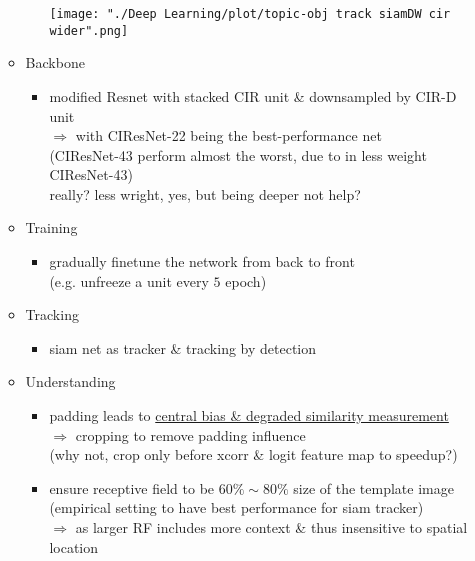 \begin{itemize}
\begin{itemize}
\begin{itemize}
		\texttt{[image: "./Deep Learning/plot/topic-obj track siamDW cir wider".png]}
		\end{itemize}
	\item Backbone
		\begin{itemize}
		\item modified Resnet with stacked CIR unit \& downsampled by CIR-D unit \\
		$\Rightarrow$ with CIResNet-22 being the best-performance net \\
		(CIResNet-43 perform almost the worst, due to in less weight CIResNet-43) \\ 
		really? less wright, yes, but being deeper not help?
		\end{itemize}
	\item Training
		\begin{itemize}
		\item gradually finetune the network from back to front \\ 
		(e.g. unfreeze a unit every $5$ epoch)
		\end{itemize}
	\item Tracking
		\begin{itemize}
		\item siam net as tracker \& tracking by detection
		\end{itemize}
	\item Understanding
		\begin{itemize}
		\item padding leads to \underline{central bias \& degraded similarity measurement} \\
		$\Rightarrow$ cropping to remove padding influence \\
		(why not, crop only before xcorr \& logit feature map to speedup?)
		\item ensure receptive field to be $60\% \sim 80\%$ size of the template image \\ 
		(empirical setting to have best performance for siam tracker) \\
		$\Rightarrow$ as larger RF includes more context \& thus insensitive to spatial location
		\end{itemize}
	\end{itemize}
\end{itemize}

